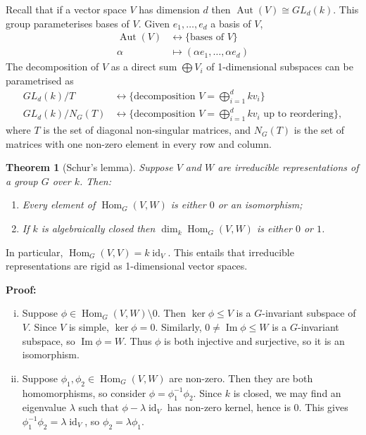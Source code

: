 \documentclass[12pt]{article}
\DeclareMathOperator{\Img}{Im}
\DeclareMathOperator{\id}{id}
\DeclareMathOperator{\Aut}{Aut}
\DeclareMathOperator{\Hom}{Hom}
\newtheorem{theorem}{Theorem}[section]
\theoremstyle{definition}
\theoremstyle{remark}
\begin{document}
Recall that if a vector space $V$ has dimension $d$ then $\Aut(V) \cong GL_d(k)$. This group parameterises bases of $V$. Given $e_1, \ldots, e_d$ a basis of $V$,
\begin{align*}
	\Aut(V) &\leftrightarrow \{\text{bases of } V\} \\
	\alpha &\mapsto (\alpha e_1, \ldots, \alpha e_d)
\end{align*}
The decomposition of $V$ as a direct sum $\bigoplus V_i$ of 1-dimensional subspaces can be parametrised as
\begin{align*}
	GL_d(k)/T &\leftrightarrow \{\text{decomposition } V = \bigoplus_{i = 1}^{d} k v_i \} \\
	GL_d(k)/N_G(T) &\leftrightarrow \{\text{decomposition } V = \bigoplus_{i = 1}^{d} k v_i \text{ up to reordering}\},
\end{align*}
where $T$ is the set of diagonal non-singular matrices, and $N_G(T)$ is the set of matrices with one non-zero element in every row and column.

\begin{theorem}[Schur's lemma]
	Suppose $V$ and $W$ are irreducible representations of a group $G$ over $k$. Then:
	\begin{enumerate}[\normalfont(i)]
		\item Every element of $\Hom_G(V, W)$ is either $0$ or an isomorphism;
		\item If $k$ is algebraically closed then $\dim_{k} \Hom_G(V, W)$ is either $0$ or $1$.
	\end{enumerate}
\end{theorem}

In particular, $\Hom_G(V, V) = k \id_{V}$. This entails that irreducible representations are rigid as 1-dimensional vector spaces.

\begin{adjustbox}{minipage = \columnwidth - 25.5pt, margin=1em, frame=1pt, margin=0em}
\textbf{Proof:}
\begin{enumerate}[(i)]
	\item Suppose $\phi \in \Hom_G(V, W) \setminus 0$. Then $\ker \phi \leq V$ is a $G$-invariant subspace of $V$. Since $V$ is simple, $\ker \phi = 0$. Similarly, $0 \neq \Img \phi \leq W$ is a $G$-invariant subspace, so $\Img \phi = W$. Thus $\phi$ is both injective and surjective, so it is an isomorphism.
	\item Suppose $\phi_1, \phi_2 \in \Hom_G(V, W)$ are non-zero. Then they are both homomorphisms, so consider $\phi = \phi_1^{-1}\phi_2$. Since $k$ is closed, we may find an eigenvalue $\lambda$ such that $\phi - \lambda \id_V$ has non-zero kernel, hence is $0$. This gives $\phi_1^{-1}\phi_2 = \lambda \id_V$, so $\phi_2 = \lambda \phi_1$.
\end{enumerate}

\end{adjustbox}
\end{document}
